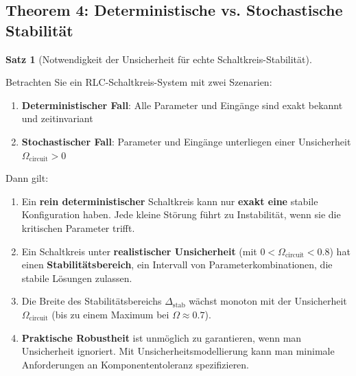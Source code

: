 \documentclass[a4paper,12pt,twoside]{report}
\theoremstyle{definition}
\newtheorem{satz}{Satz}
\begin{document}
\subsection*{Theorem 4: Deterministische vs. Stochastische Stabilität}

\begin{satz}[Notwendigkeit der Unsicherheit für echte Schaltkreis-Stabilität]
\label{satz:notwendige_unsicherheit_circuit}

Betrachten Sie ein RLC-Schaltkreis-System mit zwei Szenarien:

\begin{enumerate}
    \item \textbf{Deterministischer Fall}: Alle Parameter und Eingänge sind exakt bekannt und zeitinvariant
    \item \textbf{Stochastischer Fall}: Parameter und Eingänge unterliegen einer Unsicherheit $\Omega_{\text{circuit}} > 0$
\end{enumerate}

Dann gilt:

\begin{enumerate}
    \item Ein \textbf{rein deterministischer} Schaltkreis kann nur \textbf{exakt eine} stabile Konfiguration haben. Jede kleine Störung führt zu Instabilität, wenn sie die kritischen Parameter trifft.
    
    \item Ein Schaltkreis unter \textbf{realistischer Unsicherheit} (mit $0 < \Omega_{\text{circuit}} < 0.8$) hat einen \textbf{Stabilitätsbereich}, ein Intervall von Parameterkombinationen, die stabile Lösungen zulassen.
    
    \item Die Breite des Stabilitätsbereichs $\Delta_{\text{stab}}$ wächst monoton mit der Unsicherheit $\Omega_{\text{circuit}}$ (bis zu einem Maximum bei $\Omega \approx 0.7$).
    
    \item \textbf{Praktische Robustheit} ist unmöglich zu garantieren, wenn man Unsicherheit ignoriert. Mit Unsicherheitsmodellierung kann man minimale Anforderungen an Komponententoleranz spezifizieren.
\end{enumerate}

\end{satz}
\end{document}
